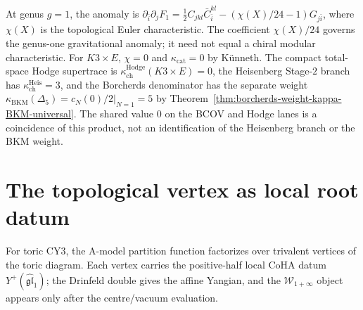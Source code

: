 \begin{remark}
At genus \(g=1\), the anomaly is
\(\partial_{\bar{i}}\partial_j F_1 =
\tfrac{1}{2}C_{jkl}\bar{C}^{kl}_{\bar{i}}-(\chi(X)/24-1)G_{j\bar{i}}\),
where \(\chi(X)\) is the topological Euler characteristic. The coefficient
\(\chi(X)/24\) governs the genus-one gravitational anomaly; it need not
equal a chiral modular characteristic. For \(K3\times E\), \(\chi=0\) and
\(\kappa_{\mathrm{cat}}=0\) by K\"unneth. The compact total-space Hodge
supertrace is \(\kappa_{\mathrm{ch}}^{\mathrm{Hodge}}(K3\times E)=0\), the
Heisenberg Stage-\(2\) branch has
\(\kappa_{\mathrm{ch}}^{\mathrm{Heis}}=3\), and the Borcherds denominator
has the separate weight
\(\kappa_{\mathrm{BKM}}(\Delta_5)=\left.c_N(0)/2\right|_{N=1}=5\) by
Theorem~\ref{thm:borcherds-weight-kappa-BKM-universal}. The shared value
\(0\) on the BCOV and Hodge lanes is a coincidence of this product, not an
identification of the Heisenberg branch or the BKM weight.
\end{remark}

\section{The topological vertex as local root datum}
\label{sec:phys-top-vertex}

For toric CY3, the A-model partition function factorizes over trivalent vertices of the toric diagram. Each vertex carries the positive-half local CoHA datum
$Y^+(\widehat{\mathfrak{gl}}_1)$; the Drinfeld double gives the affine Yangian, and the $\mathcal{W}_{1+\infty}$ object appears only after the centre/vacuum evaluation.

